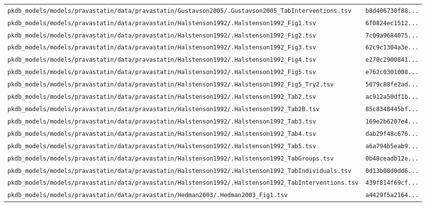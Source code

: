 \begin{longtable}{ll}
\texttt{pkdb\_models/models/pravastatin/data/pravastatin/Gustavson2005/.Gustavson2005\_TabInterventions.tsv} & \texttt{b8d406730f88...} \\
\texttt{pkdb\_models/models/pravastatin/data/pravastatin/Halstenson1992/.Halstenson1992\_Fig1.tsv} & \texttt{6f0824ec1512...} \\
\texttt{pkdb\_models/models/pravastatin/data/pravastatin/Halstenson1992/.Halstenson1992\_Fig2.tsv} & \texttt{7c09a9684075...} \\
\texttt{pkdb\_models/models/pravastatin/data/pravastatin/Halstenson1992/.Halstenson1992\_Fig3.tsv} & \texttt{62c9c1304a3e...} \\
\texttt{pkdb\_models/models/pravastatin/data/pravastatin/Halstenson1992/.Halstenson1992\_Fig4.tsv} & \texttt{e270c2900841...} \\
\texttt{pkdb\_models/models/pravastatin/data/pravastatin/Halstenson1992/.Halstenson1992\_Fig5.tsv} & \texttt{e762c0301008...} \\
\texttt{pkdb\_models/models/pravastatin/data/pravastatin/Halstenson1992/.Halstenson1992\_Fig5\_Try2.tsv} & \texttt{5079c88fe2ad...} \\
\texttt{pkdb\_models/models/pravastatin/data/pravastatin/Halstenson1992/.Halstenson1992\_Tab2.tsv} & \texttt{ac912a50df1b...} \\
\texttt{pkdb\_models/models/pravastatin/data/pravastatin/Halstenson1992/.Halstenson1992\_Tab2B.tsv} & \texttt{85c8348445bf...} \\
\texttt{pkdb\_models/models/pravastatin/data/pravastatin/Halstenson1992/.Halstenson1992\_Tab3.tsv} & \texttt{169e2b6207e4...} \\
\texttt{pkdb\_models/models/pravastatin/data/pravastatin/Halstenson1992/.Halstenson1992\_Tab4.tsv} & \texttt{dab29f48c676...} \\
\texttt{pkdb\_models/models/pravastatin/data/pravastatin/Halstenson1992/.Halstenson1992\_Tab5.tsv} & \texttt{a6a794b5eab9...} \\
\texttt{pkdb\_models/models/pravastatin/data/pravastatin/Halstenson1992/.Halstenson1992\_TabGroups.tsv} & \texttt{0b48ceadb12e...} \\
\texttt{pkdb\_models/models/pravastatin/data/pravastatin/Halstenson1992/.Halstenson1992\_TabIndividuals.tsv} & \texttt{0d13b08d0dd6...} \\
\texttt{pkdb\_models/models/pravastatin/data/pravastatin/Halstenson1992/.Halstenson1992\_TabInterventions.tsv} & \texttt{439f814f69cf...} \\
\texttt{pkdb\_models/models/pravastatin/data/pravastatin/Hedman2003/.Hedman2003\_Fig1.tsv} & \texttt{a4429f5a2164...} \\

\end{longtable}

